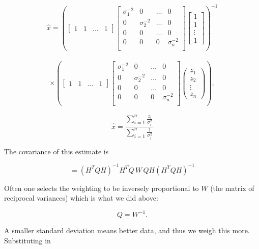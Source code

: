 \[\begin{aligned}
\hat{x}= \left(\begin{bmatrix} 1 & 1 & \dots & 1\end{bmatrix}\begin{bmatrix}
\sigma_1^{-2} & 0 & \dots & 0 \\
0 & \sigma_2^{-2} &  \dots & 0  \\
0 & 0 &  \dots & 0  \\
0 & 0 & 0 &\sigma_n^{-2}  \\
\end{bmatrix} \begin{bmatrix} 1 \\ 1 \\ \vdots \\ 1 \end{bmatrix}\right)^{-1}
\end{aligned}\]

\[\begin{aligned}
\times \left( \begin{bmatrix} 1 & 1 & \dots & 1\end{bmatrix} \begin{bmatrix}
\sigma_1^{-2} & 0 & \dots & 0 \\
0 & \sigma_2^{-2} &  \dots & 0  \\
0 & 0 &  \dots & 0  \\
0 & 0 & 0 &\sigma_n^{-2}  \\
\end{bmatrix}\begin{pmatrix} z_1 \\ z_2 \\ \vdots \\ z_n \end{pmatrix}\right) ,
\end{aligned}\]

\[\hat{x}=\displaystyle \frac{\displaystyle \sum_{i=1}^n \frac{z_i}{\sigma_i^2}}
{\displaystyle \sum_{i=1}^n \frac{1}{\sigma_i^2}}\]

The covariance of this estimate is

\[= \left(H^TQH\right)^{-1} H^T Q\, W\, Q H\left(H^TQH\right)^{-1}\]

Often one selects the weighting to be inversely proportional to \(W\)
(the matrix of reciprocal variances) which is what we did above:

\[Q = W^{-1}.\]

A smaller standard deviation means better data, and thus we weigh this
more. Substituting in

